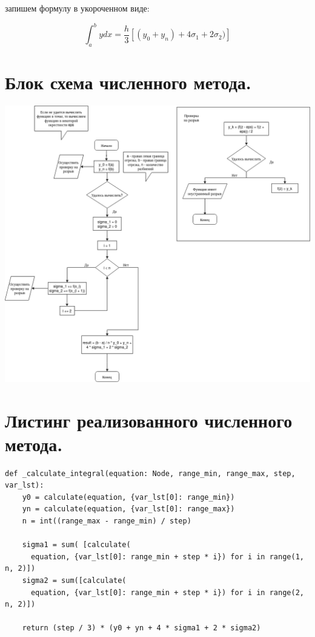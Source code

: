 \documentclass[11pt, a4paper]{article}
\begin{document}
запишем формулу в укороченном виде:

\begin{equation*}
  \int_a^b y dx = \dfrac{h}{3} [(y_0 + y_n) + 4 \sigma_1 + 2 \sigma_2)]
\end{equation*}


\section{Блок схема численного метода.}

\includegraphics[width=\linewidth]{draw.png}

\bigskip
\section{Листинг реализованного численного метода.}

\begin{verbatim}
def _calculate_integral(equation: Node, range_min, range_max, step, var_lst):
    y0 = calculate(equation, {var_lst[0]: range_min})
    yn = calculate(equation, {var_lst[0]: range_max})
    n = int((range_max - range_min) / step)

    sigma1 = sum( [calculate(
      equation, {var_lst[0]: range_min + step * i}) for i in range(1, n, 2)])
    sigma2 = sum([calculate(
      equation, {var_lst[0]: range_min + step * i}) for i in range(2, n, 2)])

    return (step / 3) * (y0 + yn + 4 * sigma1 + 2 * sigma2)
\end{verbatim}
\end{document}
